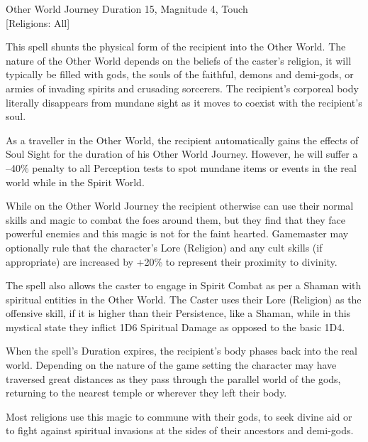 \begin{rpg-spell}
{Other World Journey}
{Duration 15, Magnitude 4, Touch\\{[Religions: All]}}

This spell shunts the physical form of the recipient into the Other World. The nature of the Other World depends on the beliefs of the caster’s religion, it will typically be filled with gods, the souls of the faithful, demons and demi-gods, or armies of invading spirits and crusading sorcerers. The recipient’s corporeal body literally disappears from mundane sight as it moves to coexist with the recipient’s soul. 

As a traveller in the Other World, the recipient automatically gains the effects of Soul Sight for the duration of his Other World Journey. However, he will suffer a –40\% penalty to all Perception tests to spot mundane items or events in the real world while in the Spirit World. 

While on the Other World Journey the recipient otherwise can use their normal skills and magic to combat the foes around them, but they find that they face powerful enemies and this magic is not for the faint hearted. Gamemaster may optionally rule that the character’s Lore (Religion) and any cult skills (if appropriate) are increased by +20\% to represent their proximity to divinity.

The spell also allows the caster to engage in Spirit Combat as per a Shaman with spiritual entities in the Other World. The Caster uses their Lore (Religion) as the offensive skill, if it is higher than their Persistence, like a Shaman, while in this mystical state they inflict 1D6 Spiritual Damage as opposed to the basic 1D4.

When the spell’s Duration expires, the recipient’s body phases back into the real world. Depending on the nature of the game setting the character may have traversed great distances as they pass through the parallel world of the gods, returning to the nearest temple or wherever they left their body.

Most religions use this magic to commune with their gods, to seek divine aid or to fight against spiritual invasions at the sides of their ancestors and demi-gods.
\end{rpg-spell}

